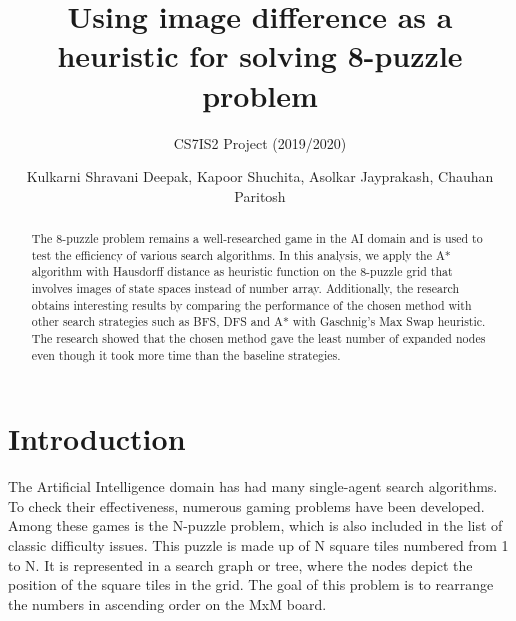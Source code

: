 \documentclass{svproc}
\begin{document}
\mainmatter
\title{Using image difference as a heuristic for solving 8-puzzle problem}
\subtitle{CS7IS2 Project (2019/2020)}
\author{Kulkarni Shravani Deepak, Kapoor Shuchita, Asolkar Jayprakash, Chauhan Paritosh}



\maketitle

\vspace{0cm}
\begin{abstract}
The 8-puzzle problem remains a well-researched game in the AI domain and is used to test the efficiency of various search algorithms. In this analysis, we apply the A* algorithm with Hausdorff distance as heuristic function on the 8-puzzle grid that involves images of state spaces instead of number array. Additionally, the research obtains interesting results by comparing the performance of the chosen method with other search strategies such as BFS, DFS and A* with Gaschnig’s Max Swap heuristic. The research showed that the chosen method gave the least number of expanded nodes even though it took more time than the baseline strategies.
\end{abstract}
%

 

\section{Introduction}
\noindent The Artificial Intelligence domain has had many single-agent search algorithms. To check their effectiveness, numerous gaming problems have been developed. Among these games is the N-puzzle problem, which is also included in the list of classic difficulty issues. This puzzle is made up of N square tiles numbered from 1 to N. It is represented in a search graph or tree, where the nodes depict the position of the square tiles in the grid. The goal of this problem is to rearrange the numbers in ascending order on the MxM board. \\
\end{document}
